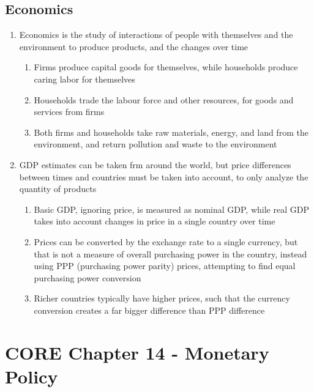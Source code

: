\subsection{Economics}
\begin{enumerate}
\item Economics is the study of interactions of people with themselves and the environment to produce products, and the changes over time
\begin{enumerate}
\item Firms produce capital goods for themselves, while households produce caring labor for themselves
\item Households trade the labour force and other resources, for goods and services from firms
\item Both firms and households take raw materials, energy, and land from the environment, and return pollution and waste to the environment
\end{enumerate}
\item GDP estimates can be taken frm around the world, but price differences between times and countries must be taken into account, to only analyze the quantity of products
\begin{enumerate}
\item Basic GDP, ignoring price, is measured as nominal GDP, while real GDP takes into account changes in price in a single country over time
\item Prices can be converted by the exchange rate to a single currency, but that is not a measure of overall purchasing power in the country, instead using PPP (purchasing power parity) prices, attempting to find equal purchasing power conversion
\item Richer countries typically have higher prices, such that the currency conversion creates a far bigger difference than PPP difference
\end{enumerate}
\end{enumerate}

\section{CORE Chapter 14 - Monetary Policy}
